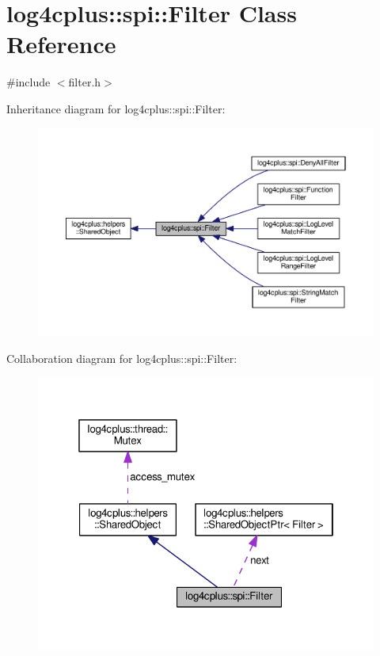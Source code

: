 \hypertarget{classlog4cplus_1_1spi_1_1Filter}{\section{log4cplus\-:\-:spi\-:\-:Filter Class Reference}
\label{classlog4cplus_1_1spi_1_1Filter}
}


{\ttfamily \#include $<$filter.\-h$>$}



Inheritance diagram for log4cplus\-:\-:spi\-:\-:Filter\-:
\nopagebreak
\begin{figure}[H]
\begin{center}
\leavevmode
\includegraphics[width=350pt]{classlog4cplus_1_1spi_1_1Filter__inherit__graph}
\end{center}
\end{figure}


Collaboration diagram for log4cplus\-:\-:spi\-:\-:Filter\-:
\nopagebreak
\begin{figure}[H]
\begin{center}
\leavevmode
\includegraphics[width=321pt]{classlog4cplus_1_1spi_1_1Filter__coll__graph}
\end{center}
\end{figure}
